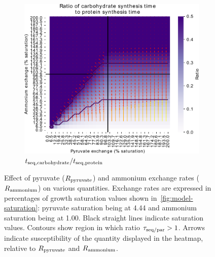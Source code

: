 \begin{figure}
  \begin{subfigure}[t]{0.45\textwidth}
  \centering
    \includegraphics[width=\linewidth]{ec_grid_pyr_amm_carb_to_prot}
    \caption{
      $t_{\mathrm{seq},\mathrm{carbohydrate}}/t_{\mathrm{seq},\mathrm{protein}}$
    }
    \label{fig:model-grid-pyr-carb-to-prot}
  \end{subfigure}
  \caption{
    Effect of pyruvate ($R_{\mathrm{pyruvate}}$) and ammonium exchange rates ($R_{\mathrm{ammonium}}$) on various quantities.
    Exchange rates are expressed in percentages of growth saturation values shown in~\ref{fig:model-saturation}: pyruvate saturation being at \SI{4.44}{\mmolgdwh} and ammonium saturation being at \SI{1.00}{\mmolgdwh}.
    Black straight lines indicate saturation values.
    Contours show region in which ratio $\tau_{\mathrm{seq}/\mathrm{par}} > 1$.
    Arrows indicate susceptibility of the quantity displayed in the heatmap, relative to $R_{\mathrm{pyruvate}}$ and $R_{\mathrm{ammonium}}$.
  }
  \label{fig:model-grid-pyr}
\end{figure}


